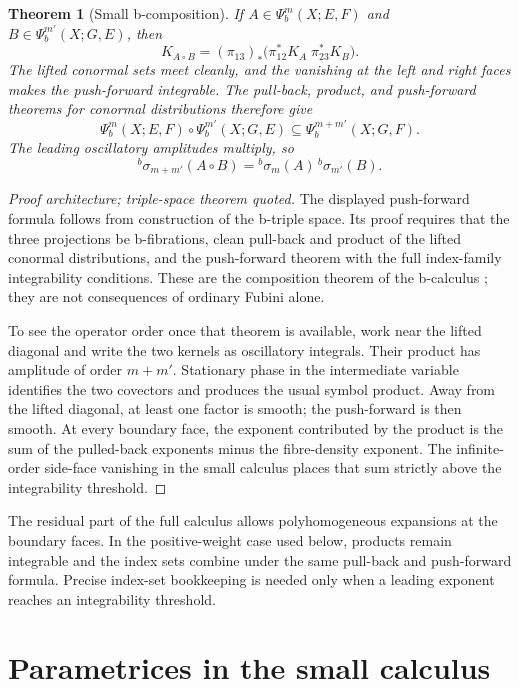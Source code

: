 \documentclass[12pt,oneside,reqno]{article}
\theoremstyle{plain}
\newtheorem{theorem}{Theorem}[section]
\theoremstyle{definition}
\theoremstyle{remark}
\begin{document}
\begin{theorem}[Small b-composition]
If \(A\in\Psi_b^m(X;E,F)\) and
\(B\in\Psi_b^{m'}(X;G,E)\), then
\[
 K_{A\circ B}
 =
 (\pi_{13})_*
 \bigl(\pi_{12}^*K_A\;\pi_{23}^*K_B\bigr).
\]
The lifted conormal sets meet cleanly, and the vanishing at the left and
right faces makes the push-forward integrable. The pull-back, product, and
push-forward theorems for conormal distributions therefore give
\[
 \Psi_b^m(X;E,F)\circ\Psi_b^{m'}(X;G,E)
 \subseteq
 \Psi_b^{m+m'}(X;G,F).
\]
The leading oscillatory amplitudes multiply, so
\[
 {}^b\sigma_{m+m'}(A\circ B)
 =
 {}^b\sigma_m(A)\,{}^b\sigma_{m'}(B).
\]
\end{theorem}

\begin{proof}[Proof architecture; triple-space theorem quoted]
The displayed push-forward formula follows from construction of the
b-triple space. Its proof requires that the three projections be
b-fibrations, clean pull-back and product of the lifted conormal
distributions, and the push-forward theorem with the full index-family
integrability conditions. These are the composition theorem of the
b-calculus \cite{Melrose}; they are not consequences of ordinary Fubini
alone.

To see the operator order once that theorem is available, work near the lifted diagonal and
write the two kernels as oscillatory integrals. Their product has amplitude
of order \(m+m'\). Stationary phase in the intermediate variable identifies
the two covectors and produces the usual symbol product. Away from the
lifted diagonal, at least one factor is smooth; the push-forward is then
smooth. At every boundary face, the exponent contributed by the product is
the sum of the pulled-back exponents minus the fibre-density exponent. The
infinite-order side-face vanishing in the small calculus places that sum
strictly above the integrability threshold.
\end{proof}

The residual part of the full calculus allows polyhomogeneous expansions at
the boundary faces. In the positive-weight case used below, products remain
integrable and the index sets combine under the same pull-back and
push-forward formula. Precise index-set bookkeeping is needed only when a
leading exponent reaches an integrability threshold.

\section{Parametrices in the small calculus}
\end{document}
